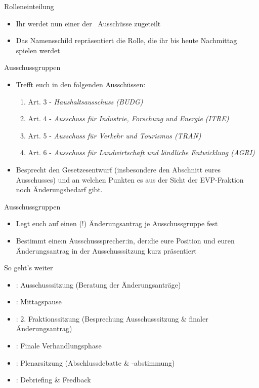 \documentclass{beamer}
\newcommand{\Fraktionskuerzel}{EVP}
\newcommand{\Fraktionskuerzel}{S\&D}
\newcommand{\Fraktionskuerzel}{Renew}
\newcommand{\Fraktionskuerzel}{Grüne/EFA}
\newcommand{\Fraktionskuerzel}{PfE}
\newcommand{\Fraktionskuerzel}{GUE/NGL}
\newcommand{\ausschussgruppen}{
        		\item Art. 3 - \textit{Haushaltsausschuss (BUDG)}
       		    \item Art. 4 - \textit{Ausschuss für Industrie, Forschung und Energie (ITRE)}
      		    \item Art. 5 - \textit{Ausschuss für Verkehr und Tourismus (TRAN)}
      		    \item Art. 6 - \textit{Ausschuss für Landwirtschaft und ländliche Entwicklung (AGRI)}
	    }
\newcommand{\ausschussgruppen}{
                \item Art. 3 - \textit{Haushaltsausschuss (BUDG)}
				\item Art. 4 - \textit{Ausschuss für Beschäftigung und soziale Angelegenheiten (EMPL)}
                \item Art. 5 - \textit{Unterausschuss für Menschenrechte (DROI)}
				\item Art. 6 - \textit{Ausschuss für bürgerliche Freiheiten, Justiz und Inneres (LIBE)}
    		}
\newcommand{\ausschussgruppen}{
            		\item Finanzierung - \newline \textit{Haushaltsausschuss (BUDG)}
	            	\item Dienstrecht - \newline \textit{Ausschuss für bürgerliche Freiheiten, Justiz und Inneres (LIBE)}
    		        \item Gegenstand und Ziele - \textit{Ausschuss für Sicherheit und Verteidigung (SEDE)}
	    	}
\begin{document}
\begin{frame}{Rolleneinteilung}
\vspace{-1.5cm}
\begin{itemize}
	\item Ihr werdet nun einer der \anzahlcomm\ Ausschüsse zugeteilt
	\item Das Namensschild repräsentiert die Rolle, die ihr bis heute Nachmittag spielen werdet
\end{itemize}
\end{frame}

\begin{frame}{Ausschussgruppen}
\vspace{-1cm}
\begin{itemize}
    \item Trefft euch in den folgenden Ausschüssen:
	\begin{enumerate}
		\ausschussgruppen
	\end{enumerate}	    
    \item Besprecht den Gesetzesentwurf (insbesondere den Abschnitt eures Ausschusses) und an welchen Punkten es aus der Sicht der \Fraktionskuerzel -Fraktion noch Änderungsbedarf gibt.
\end{itemize}
\end{frame}


\begin{frame}{Ausschussgruppen}
\vspace{-1.5cm}
\begin{itemize}
    \item Legt euch auf einen (!) Änderungsantrag je Ausschussgruppe fest
    \item Bestimmt eine:n Ausschusssprecher:in, der:die eure Position und euren Änderungsantrag in der Ausschusssitzung kurz präsentiert
\end{itemize}
\end{frame}


\begin{frame}{So geht's weiter}
\vspace{-1.5cm}
\begin{itemize}
    \item \timeAuss: Ausschusssitzung \newline (Beratung der Änderungsanträge)
    \item \timeMittag: Mittagspause
    \item \timeFrakTwo: 2. Fraktionssitzung (Besprechung Ausschusssitzung \& finaler Änderungsantrag)
    \item \timeFinVerh: Finale Verhandlungsphase
    \item \timePlenar: Plenarsitzung \newline (Abschlussdebatte \& -abstimmung)
    \item \timeDebr: Debriefing \& Feedback
\end{itemize}
\end{frame}
\end{document}
